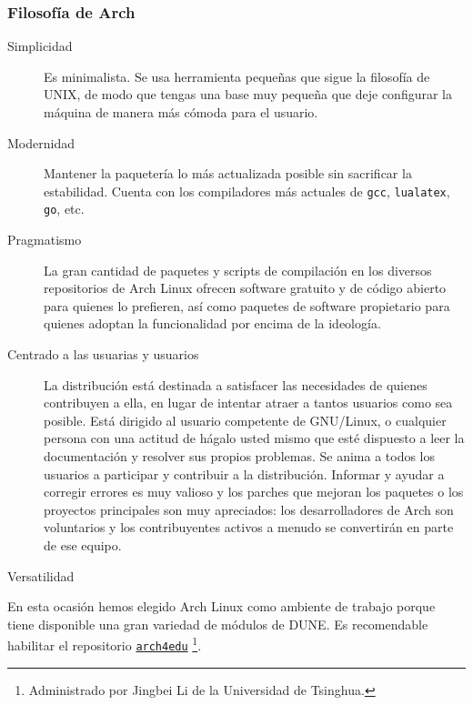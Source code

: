 \begin{frame}
	\frametitle{Filosofía de Arch}

	\begin{description}
		\item[Simplicidad]

			Es minimalista.
			Se usa herramienta pequeñas que sigue la filosofía de
			UNIX, de modo que tengas una base muy pequeña que deje
			configurar la máquina de manera más cómoda para el usuario.

		\item[Modernidad]

		Mantener la paquetería lo más actualizada posible sin
		sacrificar la estabilidad.
		Cuenta con los compiladores más actuales de \lstinline{gcc},
		\lstinline{lualatex}, \lstinline{go}, etc.

		\item[Pragmatismo]

		La gran cantidad de paquetes y scripts de compilación en los
		diversos repositorios de Arch Linux ofrecen software gratuito
		y de código abierto para quienes lo prefieren, así como
		paquetes de software propietario para quienes adoptan la
		funcionalidad por encima de la ideología.

			\item[Centrado a las usuarias y usuarios]

			La distribución está destinada a satisfacer las
			necesidades de quienes contribuyen a ella, en lugar de
			intentar atraer a tantos usuarios como sea posible.
			Está dirigido al usuario competente de GNU/Linux, o
			cualquier persona con una actitud de hágalo usted mismo
			que esté dispuesto a leer la documentación y resolver sus
			propios problemas.
			Se anima a todos los usuarios a participar y contribuir a
			la distribución.
			Informar y ayudar a corregir errores es muy valioso y los
			parches que mejoran los paquetes o los proyectos
			principales son muy apreciados:
			los desarrolladores de Arch son voluntarios y los
			contribuyentes activos a menudo se convertirán en parte de ese equipo.
		\item[Versatilidad]
	\end{description}

\end{frame}

\begin{frame}

	En esta ocasión hemos elegido Arch Linux como ambiente de trabajo
	porque tiene disponible una gran variedad de módulos de DUNE.
	Es recomendable habilitar el repositorio
	\href{https://wiki.archlinux.org/title/Unofficial\_user\_repositories\#arch4edu}{\texttt{arch4edu}}
	\footnote{Administrado por Jingbei Li de la Universidad de Tsinghua.}.
\end{frame}

